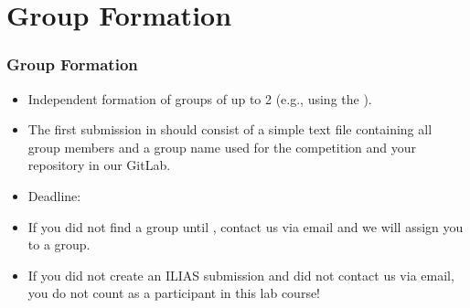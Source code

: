 \section*{Group Formation}
\begin{frame}[fragile]
  \frametitle{Group Formation}
  \begin{itemize}
      \item Independent formation of groups of up to 2 (e.g., using the ).
      \item The first submission in  should consist of a simple text file containing all group members and a group name used for the competition and your repository in our GitLab.
      \item Deadline: \textbf{\dateDeadlinePhaseZero}
      \item If you did not find a group until \dateDeadlinePhaseZero, contact us via email and we will assign you to a group.
      \item If you did not create an ILIAS submission and did not contact us via email, you do not count as a participant in this lab course!
  \end{itemize}
\end{frame}

